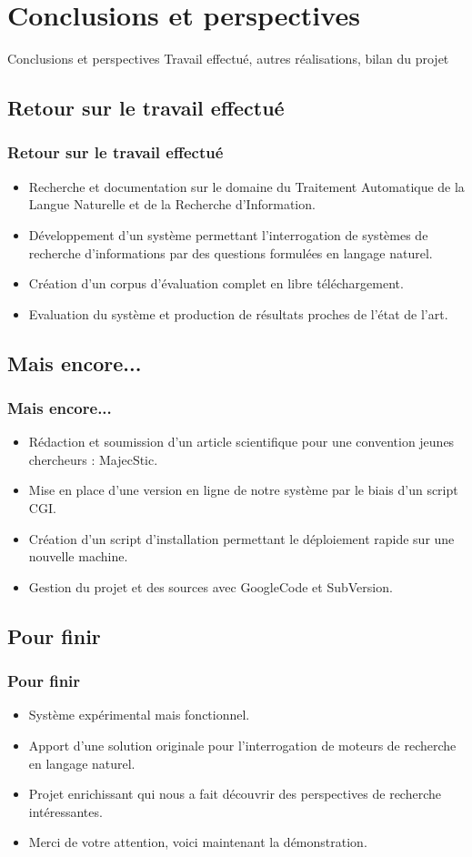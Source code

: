 \documentclass[xcolor=dvipsnames]{beamer}
\begin{document}
\section{Conclusions et perspectives}
\begin{frame}
\begin{block}{\Large{Conclusions et perspectives}}
\tiny{Travail effectué, autres réalisations, bilan du projet}
\end{block}
\end{frame}
\subsection{Retour sur le travail effectué}
\frame
{
  \frametitle{Retour sur le travail effectué}
  \begin{itemize}
    \item<1-> Recherche et documentation sur le domaine du Traitement Automatique de la Langue Naturelle et de la Recherche d'Information.
    \item<2-> Développement d'un système permettant l'interrogation de systèmes de recherche d'informations par des questions formulées en langage naturel.
    \item<3-> Création d'un corpus d'évaluation complet en libre téléchargement.
    \item<4-> Evaluation du système et production de résultats proches de l'état de l'art.
  \end{itemize}
}
\subsection{Mais encore...}
\frame
{
  \frametitle{Mais encore...}
  \begin{itemize}
    \item<1-> Rédaction et soumission d'un article scientifique pour une convention jeunes chercheurs : MajecStic.
    \item<2-> Mise en place d'une version en ligne de notre système par le biais d'un script CGI.
    \item<3-> Création d'un script d'installation permettant le déploiement rapide sur une nouvelle machine.
    \item<4-> Gestion du projet et des sources avec GoogleCode et SubVersion.
  \end{itemize}
}
\subsection{Pour finir}
\frame
{
  \frametitle{Pour finir} 
  \begin{itemize}
      \item<1-> Système expérimental mais fonctionnel.
      \item<2-> Apport d'une solution originale pour l'interrogation de moteurs de recherche en langage naturel.
      \item<3-> Projet enrichissant qui nous a fait découvrir des perspectives de recherche intéressantes.
      \item<4-> Merci de votre attention, voici maintenant la démonstration.
  \end{itemize}
}
\end{document}
